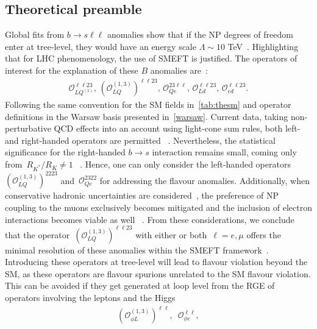 \subsection{Theoretical preamble}
Global fits from $ b \to s \ell \ell$ anomalies show that if the NP degrees of freedom enter at tree-level, they would have an energy scale $ \Lambda \sim 10$ TeV~\cite{DAmico:2017mtc,Geng:2017svp,Capdevila:2017bsm,Ciuchini:2017mik,Hiller:2017bzc}. Highlighting that for LHC phenomenology, the use of SMEFT is justified.  The operators of interest for the explanation of these $B$ anomalies are~\cite{Celis:2017doq,Ciuchini:2019usw,Aebischer:2019mlg}: 
\begin{eqnarray}
	\label{eq:tree_LUV_SMEFT}
	\mathcal{O}_{LQ^{(1)}}^{\ell \ell 23}, \,	(\mathcal{O}_{LQ}^{(1,3)})^{\ell \ell 23}, \, \mathcal{O}_{Qe}^{23 \ell \ell}, \,  \mathcal{O}_{Ld}^{ \ell \ell 23}, \, \mathcal{O}_{ed}^{\ell \ell 23 }.
\end{eqnarray}
Following the same convention for the SM fields in~\autoref{tab:thesm} and operator definitions in the Warsaw basis presented in~\autoref{warsaw}.  Current data, taking non-perturbative QCD effects into an account using light-cone sum rules, both left- and right-handed operators are permitted ~\cite{Ciuchini:2019usw,Alok:2019ufo,Alguero:2019ptt,Kowalska:2019ley}. Nevertheless, the statistical significance for the right-handed $b \to s$ interaction remains small, coming only from~$R_{K^{*}}/R_{K} \neq 1$ ~\cite{Hiller:2017bzc,Ciuchini:2019usw}. Hence, one can only consider the left-handed operators ~$(	\mathcal{O}_{LQ}^{(1,3)} )^{22 23}$ and~$\mathcal{O}_{Qe}^{23 22}$ for addressing the flavour anomalies. Additionally, when conservative hadronic uncertainties are considered~\cite{Jager:2014rwa,Ciuchini:2015qxb,Arbey:2018ics}, the preference of NP coupling to the muons exclusively becomes mitigated and the inclusion of electron interactions becomes viable as well ~\cite{Ciuchini:2017mik}. From these considerations, we conclude that the operator~$(	\mathcal{O}_{LQ}^{(1,3)} )^{\ell \ell 23}$ with either or both~$ \ell=e, \mu$  offers the minimal resolution of these anomalies within the SMEFT framework~\cite{Ciuchini:2019usw}.\\
Introducing these operators at tree-level will lead to flavour violation beyond the SM, as these operators are flavour spurions unrelated to the SM flavour violation. This can be avoided if they get generated at loop level from the RGE of operators involving the leptons and the Higgs~\cite{Celis:2017doq} 
\begin{eqnarray} 
	\label{eq:SMEFT_op_HL}
	(	\mathcal{O}_{\phi L}^{(1,3)})^{\ell \ell},	\,\,\, 	\mathcal{O}_{\phi e}^{\ell \ell},
\end{eqnarray}
